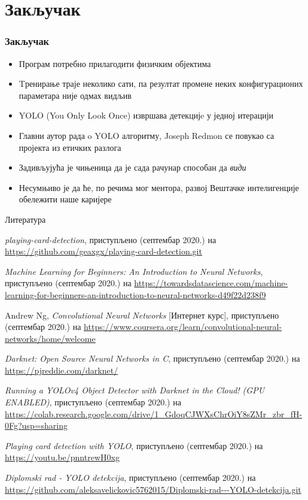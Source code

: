 \section{Закључак}
\begin{frame}
\frametitle{Закључак}
\begin{itemize}
 \item Програм потребно прилагодити физичким објектима
 \item Tренирање траје неколико сати, па резултат
  промене неких конфигурационих параметара није одмах видљив
 \item YOLO (You Only Look Once) извршава детекцијe у једној итерацији
 \item Главни
  аутор рада o YOLO алгоритму, Joseph Redmon
  се повукао са пројекта из етичких разлога
 \item Задивљујућа је чињеница да је сада рачунар
 способан да \textit{види}
 \item Несумњиво је да ће, по речима мог ментора,
\alert{развој Вештачке интелигенције обележити наше каријере}
\end{itemize}
\end{frame}

\begin{frame}[allowframebreaks]{Литература}

\begin{thebibliography}{99}

\textit{playing-card-detection}, приступљено (септембар 2020.) на
\url{https://github.com/geaxgx/playing-card-detection.git}

\textit{Machine Learning for Beginners: An Introduction to Neural Networks}, приступљено (септембар 2020.) на
\url{https://towardsdatascience.com/machine-learning-for-beginners-an-introduction-to-neural-networks-d49f22d238f9}

Andrew Ng, \textit{Convolutional Neural Networks} [Интернет курс], приступљено (септембар 2020.) на
\url{https://www.coursera.org/learn/convolutional-neural-networks/home/welcome}

\textit{Darknet: Open Source Neural Networks in C}, приступљено (септембар 2020.) на
\url{https://pjreddie.com/darknet/}

\textit{Running a YOLOv4 Object Detector with Darknet in the Cloud! (GPU ENABLED)}, приступљено (септембар 2020.) на
\url{https://colab.research.google.com/drive/1_GdoqCJWXsChrOiY8sZMr_zbr_fH-0Fg?usp=sharing}

\textit{Playing card detection with YOLO}, приступљено (септембар 2020.) на
\url{https://youtu.be/pnntrewH0xg}

\textit{Diplomski rad - YOLO detekcija}, приступљено (септембар 2020.) на
\url{https://github.com/aleksavelickovic5762015/Diplomski-rad---YOLO-detekcija.git}

\end{thebibliography}

\end{frame}

